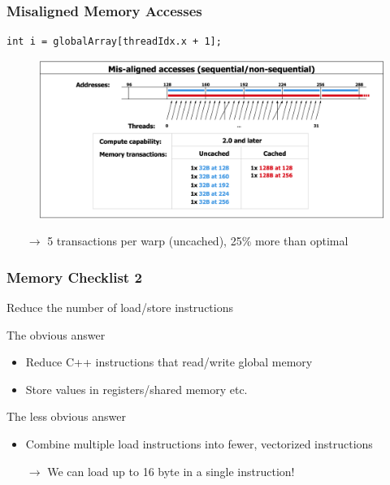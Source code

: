 \documentclass[aspectratio=169,handout]{beamer}
\begin{document}
\begin{frame}[fragile]
	\frametitle{Misaligned Memory Accesses}
\begin{lstlisting}
int i = globalArray[threadIdx.x + 1];
\end{lstlisting}
		\begin{figure}
	\includegraphics[height=0.7\textheight]{coa2}
\end{figure}
\begin{itemize}
	\item[$\rightarrow$] 5 transactions per warp (uncached), 25\% more than optimal
	\end{itemize}
\end{frame}


\begin{frame}[fragile]
\frametitle{Memory Checklist 2}
\begin{mdframed}[]
Reduce the number of load/store instructions
\end{mdframed}
\vspace{0.3cm}
The obvious answer
\begin{itemize}
\item Reduce C++ instructions that read/write global memory
\item Store values in registers/shared memory etc.
\end{itemize}
The less obvious answer
\begin{itemize}
\item Combine multiple load instructions into fewer, vectorized instructions
\item[$\rightarrow$] We can load up to 16 byte in a single instruction!
\end{itemize}
\end{frame}
\end{document}
